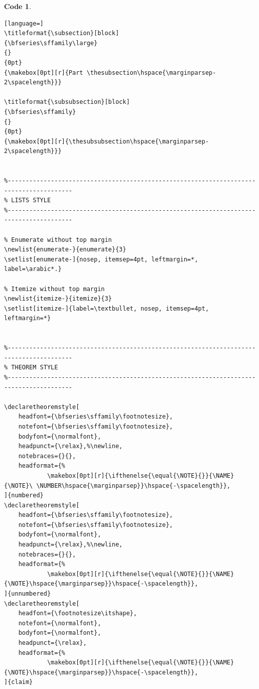 \documentclass{course}
\theoremstyle{unnumbered}
\newtheorem{code}{Code}
\begin{document}
\begin{code}
\begin{lstlisting}[language=]
\titleformat{\subsection}[block]
{\bfseries\sffamily\large}
{}
{0pt}
{\makebox[0pt][r]{Part \thesubsection\hspace{\marginparsep-2\spacelength}}}

\titleformat{\subsubsection}[block]
{\bfseries\sffamily}
{}
{0pt}
{\makebox[0pt][r]{\thesubsubsection\hspace{\marginparsep-2\spacelength}}}


%----------------------------------------------------------------------------------------
% LISTS STYLE
%----------------------------------------------------------------------------------------

% Enumerate without top margin
\newlist{enumerate-}{enumerate}{3}
\setlist[enumerate-]{nosep, itemsep=4pt, leftmargin=*, label=\arabic*.}

% Itemize without top margin
\newlist{itemize-}{itemize}{3}
\setlist[itemize-]{label=\textbullet, nosep, itemsep=4pt, leftmargin=*}


%----------------------------------------------------------------------------------------
% THEOREM STYLE
%----------------------------------------------------------------------------------------

\declaretheoremstyle[
	headfont={\bfseries\sffamily\footnotesize},
	notefont={\bfseries\sffamily\footnotesize},
	bodyfont={\normalfont},
	headpunct={\relax},%\newline,
	notebraces={}{},
	headformat={%
			\makebox[0pt][r]{\ifthenelse{\equal{\NOTE}{}}{\NAME}{\NOTE}\ \NUMBER\hspace{\marginparsep}}\hspace{-\spacelength}},
]{numbered}
\declaretheoremstyle[
	headfont={\bfseries\sffamily\footnotesize},
	notefont={\bfseries\sffamily\footnotesize},
	bodyfont={\normalfont},
	headpunct={\relax},%\newline,
	notebraces={}{},
	headformat={%
			\makebox[0pt][r]{\ifthenelse{\equal{\NOTE}{}}{\NAME}{\NOTE}\hspace{\marginparsep}}\hspace{-\spacelength}},
]{unnumbered}
\declaretheoremstyle[
	headfont={\footnotesize\itshape},
	notefont={\normalfont},
	bodyfont={\normalfont},
	headpunct={\relax},
	headformat={%
			\makebox[0pt][r]{\ifthenelse{\equal{\NOTE}{}}{\NAME}{\NOTE}\hspace{\marginparsep}}\hspace{-\spacelength}},
]{claim}


\end{lstlisting}
\end{code}
\end{document}
